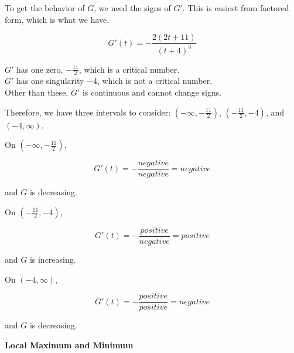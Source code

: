 \documentclass{ximera}
\begin{document}
\begin{explanation}

To get the behavior of $G$, we need the signs of $G'$.  This is easiest from factored form, which is what we have.


\[
G'(t) = -\frac{2(2t+11)}{(t+4)^3}
\]


$G'$ has one zero, $-\frac{11}{2}$, which is a critical number. \\


$G'$ has one singularity $-4$, which is not a critical number. \\



Other than these, $G'$ is continuous and cannot change signs.


Therefore, we have three intervals to consider:  $\left( -\infty, -\frac{11}{2} \right)$, $\left( -\frac{11}{2}, -4 \right)$, and $(-4, \infty)$.



On $\left( -\infty, -\frac{11}{2} \right)$, 

\[

G'(t) = -\frac{negative}{negative} = negative
\]


and $G$ is decreasing.






On $\left( -\frac{11}{2}, -4 \right)$, 

\[

G'(t) = -\frac{positive}{negative} = positive
\]


and $G$ is increasing.







On $(-4, \infty)$, 

\[

G'(t) = -\frac{positive}{positive} = negative
\]


and $G$ is decreasing.





\end{explanation}
















\textbf{Local Maximum and Minimum}
\end{document}
